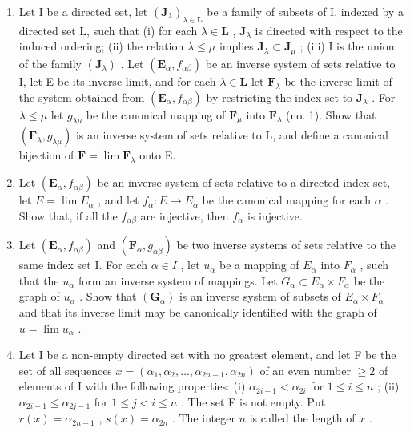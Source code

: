 \begin{enumerate}
\def\labelenumi{\arabic{enumi}.}
\item
  Let I be a directed set, let \((\mathbf{J}_{\lambda})_{\lambda \in \mathbf{L}}\) be a family of subsets of I, indexed by a directed set L, such that (i) for each \(\lambda \in \mathbf{L}\) , \(\mathbf{J}_{\lambda}\) is directed with respect to the induced ordering; (ii) the relation \(\lambda \leqslant \mu\) implies \(\mathbf{J}_{\lambda} \subset \mathbf{J}_{\mu}\) ; (iii) I is the union of the family \((\mathbf{J}_{\lambda})\) . Let \((\mathbf{E}_{\alpha}, f_{\alpha\beta})\) be an inverse system of sets relative to I, let E be its inverse limit, and for each \(\lambda \in \mathbf{L}\) let \(\mathbf{F}_{\lambda}\) be the inverse limit of the system obtained from \((\mathbf{E}_{\alpha}, f_{\alpha\beta})\) by restricting the index set to \(\mathbf{J}_{\lambda}\) . For \(\lambda \leqslant \mu\) let \(g_{\lambda \mu}\) be the canonical mapping of \(\mathbf{F}_{\mu}\) into \(\mathbf{F}_{\lambda}\) (no. 1). Show that \((\mathbf{F}_{\lambda}, g_{\lambda \mu})\) is an inverse system of sets relative to L, and define a canonical bijection of \(\mathbf{F} = \lim \mathbf{F}_{\lambda}\) onto E.
\item
  Let \((\mathbf{E}_{\alpha}, f_{\alpha\beta})\) be an inverse system of sets relative to a directed index set, let \(E = \lim E_{\alpha}\) , and let \(f_{\alpha}: E \to E_{\alpha}\) be the canonical mapping for each \(\alpha\) . Show that, if all the \(f_{\alpha\beta}\) are injective, then \(f_{\alpha}\) is injective.
\item
  Let \((\mathbf{E}_{\alpha}, f_{\alpha\beta})\) and \((\mathbf{F}_{\alpha}, g_{\alpha\beta})\) be two inverse systems of sets relative to the same index set I. For each \(\alpha \in I\) , let \(u_{\alpha}\) be a mapping of \(E_{\alpha}\) into \(F_{\alpha}\) , such that the \(u_{\alpha}\) form an inverse system of mappings. Let \(G_{\alpha} \subset E_{\alpha} \times F_{\alpha}\) be the graph of \(u_{\alpha}\) . Show that \((\mathbf{G}_{\alpha})\) is an inverse system of subsets of \(E_{\alpha} \times F_{\alpha}\) and that its inverse limit may be canonically identified with the graph of \(u = \lim u_{\alpha}\) .
\item
  Let I be a non-empty directed set with no greatest element, and let F be the set of all sequences \(x = (\alpha_1, \alpha_2, \ldots, \alpha_{2n-1}, \alpha_{2n})\) of an even number \(\geqslant 2\) of elements of I with the following properties: (i) \(\alpha_{2i-1} < \alpha_{2i}\) for \(1 \leqslant i \leqslant n\) ; (ii) \(\alpha_{2i-1} \leqslant \alpha_{2j-1}\) for \(1 \leqslant j < i \leqslant n\) . The set F is not empty. Put \(r(x) = \alpha_{2n-1}\) , \(s(x) = \alpha_{2n}\) . The integer \(n\) is called the length of \(x\) .
\end{enumerate}

